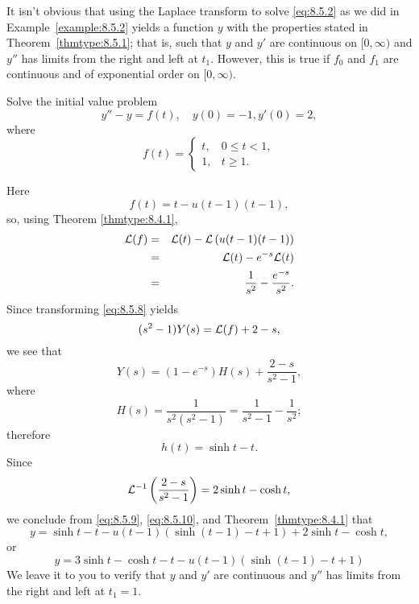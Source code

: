 \documentclass{ximera}
\begin{document}
\begin{remark}
It isn't obvious that using the Laplace transform to solve
\eqref{eq:8.5.2} as we did in Example~\ref{example:8.5.2} yields a function
$y$ with the properties stated in Theorem~\ref{thmtype:8.5.1}; that is,
such that $y$ and $y'$ are continuous on $[0,\infty)$ and $y''$ has
limits from the right and left at $t_1$. However, this is true if  $f_0$ and $f_1$ are continuous and of exponential order on $[0,\infty)$. 
\end{remark}

\begin{example}\label{example:8.5.3}
Solve the initial value problem
\begin{equation}\label{eq:8.5.8}
y''-y=f(t), \quad   y(0)=-1,  y'(0)=2,
\end{equation}
where
$$
f(t)=\left\{\begin{array}{cl}
t,&0\leq t<1,\\
1,&t\geq 1.
\end{array}\right.
$$
\begin{explanation}
Here
$$
f(t)=t-u(t-1)(t-1),
$$
so, using Theorem \ref{thmtype:8.4.1},
\begin{eqnarray*}
{\cal L}(f)&=&{\cal L}(t)-{\cal L}\left(u(t-1)(t-1)\right)\\
&=&{\cal L}(t)-e^{-s}{\cal L}(t)\\
&=&\frac{1}{s^2}-\frac{e^{-s}}{s^2}.
\end{eqnarray*}
Since transforming  \eqref{eq:8.5.8} yields
$$
(s^2-1) Y(s)={\cal L}(f)+2-s,
$$
we see that
\begin{equation}\label{eq:8.5.9}
Y(s)=(1-e^{-s})H(s)+\frac{2-s}{s^2-1},
\end{equation}
where
$$
H(s)=\frac{1}{s^2(s^2-1)}=\frac{1}{s^2-1}-\frac{1}{s^2};
$$
 therefore
\begin{equation}\label{eq:8.5.10}
h(t)=\sinh t-t.
\end{equation}
Since
$$
{\cal L}^{-1}\left(\frac{2-s}{s^2-1}\right)=2\sinh t-\cosh t,
$$
we conclude from  \eqref{eq:8.5.9},  \eqref{eq:8.5.10}, and
Theorem~\ref{thmtype:8.4.1} that
$$
y=\sinh t-t-u(t-1)\left(\sinh (t-1)-t+1\right)+2\sinh t-
\cosh t,
$$
or
\begin{equation}\label{eq:8.5.11}
y=3\sinh t-\cosh t-t-u(t-1)\left(\sinh (t-1)-t+1\right)
\end{equation}
We leave it to you to verify that $y$  and $y'$ are continuous and
$y''$ has limits from the right and left at
$t_1=1$.
\end{explanation}
\end{example}
\end{document}
